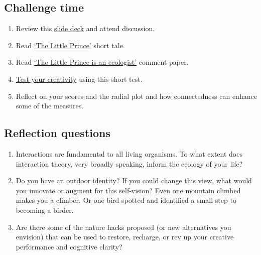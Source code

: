 \documentclass[
]{book}
\providecommand{\tightlist}{%
  \setlength{\itemsep}{0pt}\setlength{\parskip}{0pt}}
\begin{document}
\hypertarget{challenge-time-1}{%
\subsection*{Challenge time}\label{challenge-time-1}}

\begin{enumerate}
\def\labelenumi{\arabic{enumi}.}
\tightlist
\item
  Review this \href{https://figshare.com/articles/presentation/Nature_hacks_for_life/16878808}{slide deck} and attend discussion.\\
\item
  Read \href{https://www.goodreads.com/book/show/157993.The_Little_Prince}{`The Little Prince'} short tale.\\
\item
  Read \href{https://ojs.library.queensu.ca/index.php/IEE/article/view/15122}{`The Little Prince is an ecologist'} comment paper.\\
\item
  \href{http://www.testmycreativity.com}{Test your creativity} using this short test.\\
\item
  Reflect on your scores and the radial plot and how connectedness can enhance some of the measures.
\end{enumerate}

\hypertarget{reflection-questions-1}{%
\subsection*{Reflection questions}\label{reflection-questions-1}}

\begin{enumerate}
\def\labelenumi{\arabic{enumi}.}
\tightlist
\item
  Interactions are fundamental to all living organisms. To what extent does interaction theory, very broadly speaking, inform the ecology of your life?\\
\item
  Do you have an outdoor identity? If you could change this view, what would you innovate or augment for this self-vision? Even one mountain climbed makes you a climber. Or one bird spotted and identified a small step to becoming a birder.\\
\item
  Are there some of the nature hacks proposed (or new alternatives you envision) that can be used to restore, recharge, or rev up your creative performance and cognitive clarity?
\end{enumerate}
\end{document}
